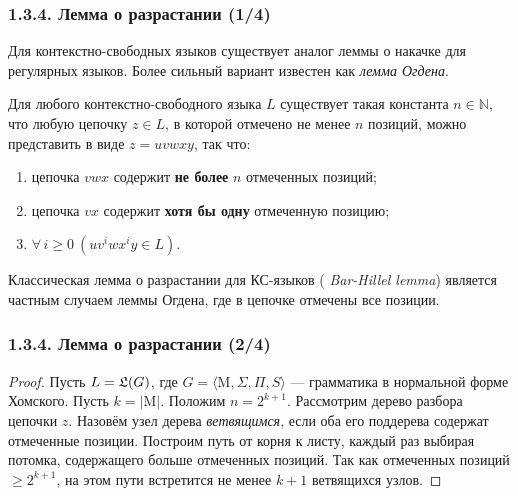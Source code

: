 \documentclass[mathserif,12pt,aspectratio=169]{beamer}
\renewcommand{\index}[1]{}
\def\odmkey#1#2{{\it\color{red} #1}\index{#2}}
\def\A#1#2{\forall\,#1\ \left(#2\right)}
\let\ge\geqslant
\begin{document}
\begin{frame}
\frametitle{1.3.4. Лемма о разрастании (1/4)}

Для контекстно-свободных языков существует аналог леммы о накачке для регулярных языков. Более сильный вариант известен как \odmkey{лемма Огдена}{Лемма!Огдена}.

\begin{theorem}
Для любого контекстно-свободного языка $L$ существует такая константа $n \in \mathbb{N}$, что любую цепочку $z \in L$, в которой отмечено не менее $n$ позиций, можно представить в виде $z = u v w x y$, так что:
\begin{enumerate}
    \item цепочка $vwx$ содержит \textbf{не более} $n$ отмеченных позиций;
    \item цепочка $vx$ содержит \textbf{хотя бы одну} отмеченную позицию;
    \item $\A{i \ge 0}{u v^i w x^i y \in L}$.
\end{enumerate}
\end{theorem}

\begin{remark}
Классическая лемма о разрастании для КС-языков (\odmkey{Bar-Hillel lemma}{Лемма!Бар-Хиллела}) является частным случаем леммы Огдена, где в цепочке отмечены все позиции.
\end{remark}
\end{frame}

\begin{frame}
\frametitle{1.3.4. Лемма о разрастании (2/4)}

\begin{proof}
Пусть $L=\frak{L}(G)$, где $G=\langle \mathrm{M}, \Sigma, \Pi, S\rangle$ — грамматика в нормальной форме Хомского. Пусть $k=|\mathrm{M}|$. Положим $n = 2^{k+1}$.
Рассмотрим дерево разбора цепочки $z$. Назовём узел дерева \odmkey{ветвящимся}{Узел!ветвящийся}, если оба его поддерева содержат отмеченные позиции.
Построим путь от корня к листу, каждый раз выбирая потомка, содержащего больше отмеченных позиций.
Так как отмеченных позиций $\ge 2^{k+1}$, на этом пути встретится не менее $k+1$ ветвящихся узлов.
\end{proof}
\end{frame}
\end{document}

